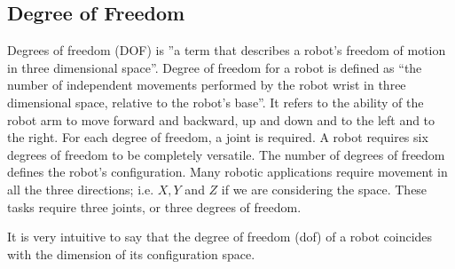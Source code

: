 
\subsection{Degree of Freedom}

Degrees of freedom (DOF) is ”a term that describes a robot's freedom of motion in three dimensional space”. Degree of freedom for a robot is defined as “the number of independent movements performed by the robot wrist in three dimensional space, relative to the robot's base”. It refers to the ability of the robot arm to move forward and backward, up and down and to the left and to the right. For each degree of freedom, a joint is required. A robot requires six degrees of freedom to be completely versatile. The number of degrees of freedom defines the robot's configuration. Many robotic applications require movement in all the three directions; i.e. $X, Y$ and $Z$ if we are considering the space. These tasks require three joints, or three degrees of freedom.

It is very intuitive to say that the degree of freedom (dof) of a robot coincides with the dimension of its configuration space.




